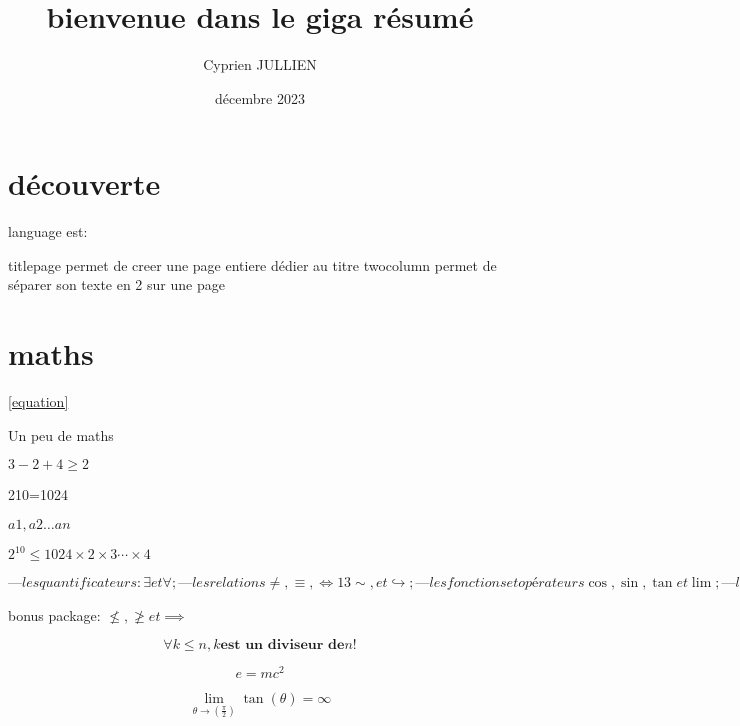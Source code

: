 \documentclass[french,titlepage] {article}
\title{bienvenue dans le giga résumé}
\author{ Cyprien JULLIEN}
\date{décembre 2023}
\begin{document}


\maketitle 
\setcounter{tocdepth}{6}
\tableofcontents

\section{découverte}
language est:
\languagename

titlepage permet de creer une page entiere dédier au titre
twocolumn permet de séparer son texte en 2 sur une page
\blindtext 


\section{maths}

\eqref{equation}

Un peu de maths
 
$3-2+4 \geq 2$

2{10}=1024

$a1,a2\ldots an$

$2^{10} \leq 1024 \times 2 \times 3 \cdots \times 4$


$— les quantificateurs : \exists et \forall ;
— les relations \neq, \equiv, \iff 13 \sim, et \hookrightarrow ;
— les fonctions et opérateurs \cos, \sin, \tan et \lim ;
— le constructeur de fraction \frac qui prend deux arguments et que nous
avons vu en cours-td ;
— des constantes, comme \infty.$


bonus package:
$\nleq, \ngeq et \implies$ 

\begin{equation}
\forall k \leq n, k \textbf{est un diviseur de} n!
\end{equation}

\begin{equation}
e = mc^2 \label{equation}
\end{equation}

\begin{equation}
\lim_{\theta \to (\frac{\pi}{2} ) }
\tan ( \theta ) = \infty
\end{equation}
\end{document}
